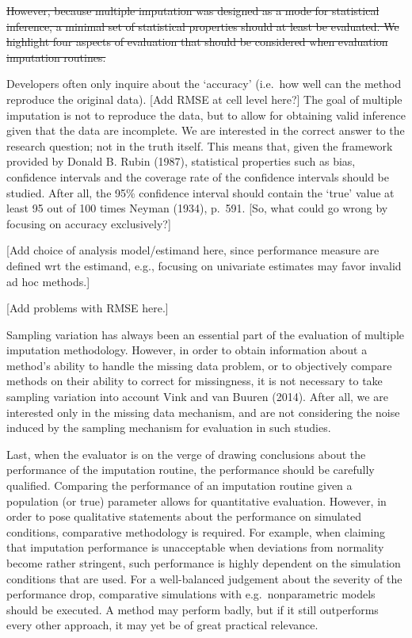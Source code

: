 \documentclass[
]{article}
\begin{document}
\sout{However, because multiple imputation was designed as a mode for
statistical inference, a minimal set of statistical properties should at
least be evaluated. We highlight four aspects of evaluation that should
be considered when evaluation imputation routines.}

Developers often only inquire about the `accuracy' (i.e.~how well can
the method reproduce the original data). {[}Add RMSE at cell level
here?{]} The goal of multiple imputation is not to reproduce the data,
but to allow for obtaining valid inference given that the data are
incomplete. We are interested in the correct answer to the research
question; not in the truth itself. This means that, given the framework
provided by Donald B. Rubin (1987), statistical properties such as bias,
confidence intervals and the coverage rate of the confidence intervals
should be studied. After all, the 95\% confidence interval should
contain the `true' value at least 95 out of 100 times Neyman (1934),
p.~591. {[}So, what could go wrong by focusing on accuracy
exclusively?{]}

{[}Add choice of analysis model/estimand here, since performance measure
are defined wrt the estimand, e.g., focusing on univariate estimates may
favor invalid ad hoc methods.{]}

{[}Add problems with RMSE here.{]}

Sampling variation has always been an essential part of the evaluation
of multiple imputation methodology. However, in order to obtain
information about a method's ability to handle the missing data problem,
or to objectively compare methods on their ability to correct for
missingness, it is not necessary to take sampling variation into account
Vink and van Buuren (2014). After all, we are interested only in the
missing data mechanism, and are not considering the noise induced by the
sampling mechanism for evaluation in such studies.

Last, when the evaluator is on the verge of drawing conclusions about
the performance of the imputation routine, the performance should be
carefully qualified. Comparing the performance of an imputation routine
given a population (or true) parameter allows for quantitative
evaluation. However, in order to pose qualitative statements about the
performance on simulated conditions, comparative methodology is
required. For example, when claiming that imputation performance is
unacceptable when deviations from normality become rather stringent,
such performance is highly dependent on the simulation conditions that
are used. For a well-balanced judgement about the severity of the
performance drop, comparative simulations with e.g.~nonparametric models
should be executed. A method may perform badly, but if it still
outperforms every other approach, it may yet be of great practical
relevance.
\end{document}
